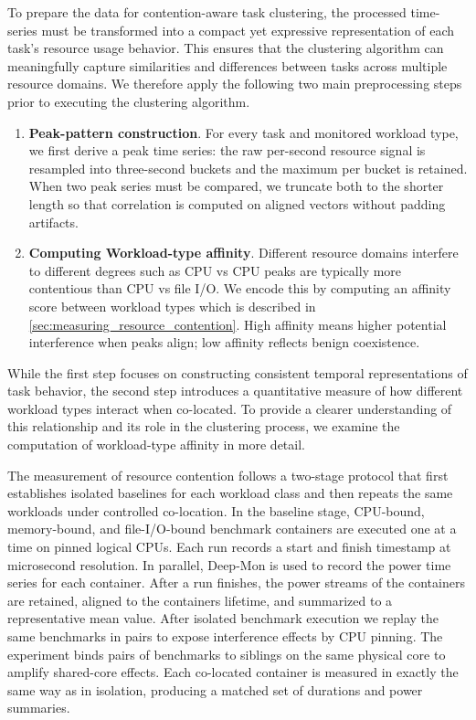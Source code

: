 To prepare the data for contention-aware task clustering, the processed time-series must be transformed into a compact yet expressive representation of each task's resource usage behavior. This ensures that the clustering algorithm can meaningfully capture similarities and differences between tasks across multiple resource domains. We therefore apply the following two main preprocessing steps prior to executing the clustering algorithm.

\begin{enumerate}
    \item \textbf{Peak-pattern construction}. For every task and monitored workload type, we first derive a peak time series: the raw per-second resource signal is resampled into three-second buckets and the maximum per bucket is retained. When two peak series must be compared, we truncate both to the shorter length so that correlation is computed on aligned vectors without padding artifacts.
    \item \textbf{Computing Workload-type affinity}. Different resource domains interfere to different degrees such as CPU vs CPU peaks are typically more contentious than CPU vs file I/O. We encode this by computing an affinity score between workload types which is described in \ref{sec:measuring_resource_contention}. High affinity means higher potential interference when peaks align; low affinity reflects benign coexistence.
\end{enumerate}

While the first step focuses on constructing consistent temporal representations of task behavior, the second step introduces a quantitative measure of how different workload types interact when co-located. To provide a clearer understanding of this relationship and its role in the clustering process, we examine the computation of workload-type affinity in more detail.

\label{sec:measuring_resource_contention}

The measurement of resource contention follows a two-stage protocol that first establishes isolated baselines for each workload class and then repeats the same workloads under controlled co-location. In the baseline stage, CPU-bound, memory-bound, and file-I/O-bound benchmark containers are executed one at a time on pinned logical CPUs. Each run records a start and finish timestamp at microsecond resolution. In parallel, Deep-Mon is used to record the power time series for each container. After a run finishes, the power streams of the containers are retained, aligned to the containers lifetime, and summarized to a representative mean value.
After isolated benchmark execution we replay the same benchmarks in pairs to expose interference effects by CPU pinning. The experiment binds pairs of benchmarks to siblings on the same physical core to amplify shared-core effects. Each co-located container is measured in exactly the same way as in isolation, producing a matched set of durations and power summaries.

